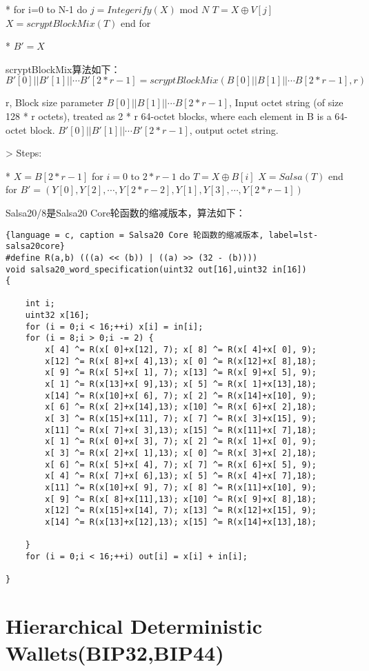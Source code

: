 \documentclass{article}
\begin{document}
 * for i=0 to N-1 do    
 $j=Integerify(X)$ mod $N$  
 $T=X \oplus V[j]$  
 $X=scryptBlockMix(T)$  
 end for
 
 * $B'=X$

scryptBlockMix算法如下：
 $B'[0]||B'[1]||\cdots B'[2*r-1]=scryptBlockMix(B[0]||B[1]||\cdots B[2*r-1],r)$

 r, Block size parameter
 $B[0]||B[1]||\cdots B[2*r-1]$, Input octet string (of size 128 * r octets), treated as 2 * r 64-octet blocks, where each element in B is a 64-octet block.
 $B'[0]||B'[1]||\cdots B'[2*r-1]$, output octet string.

> Steps:

* $X = B[2*r-1]$
 for $i = 0$ to $2*r - 1$ do    
$T=X \oplus B[i]$  
$X=Salsa(T)$  
end for   
$B'=(Y[0],Y[2],\cdots,Y[2*r-2],
Y[1],Y[3],\cdots, Y[2*r-1])$

Salsa20/8是Salsa20 Core轮函数的缩减版本，算法如下：


\begin{lstlisting}{language = c, caption = Salsa20 Core 轮函数的缩减版本, label=lst-salsa20core}
#define R(a,b) (((a) << (b)) | ((a) >> (32 - (b)))) 
void salsa20_word_specification(uint32 out[16],uint32 in[16]) 
{

	int i; 
	uint32 x[16]; 
	for (i = 0;i < 16;++i) x[i] = in[i]; 
	for (i = 8;i > 0;i -= 2) { 
		x[ 4] ^= R(x[ 0]+x[12], 7); x[ 8] ^= R(x[ 4]+x[ 0], 9);
		x[12] ^= R(x[ 8]+x[ 4],13); x[ 0] ^= R(x[12]+x[ 8],18); 
		x[ 9] ^= R(x[ 5]+x[ 1], 7); x[13] ^= R(x[ 9]+x[ 5], 9); 
		x[ 1] ^= R(x[13]+x[ 9],13); x[ 5] ^= R(x[ 1]+x[13],18); 
		x[14] ^= R(x[10]+x[ 6], 7); x[ 2] ^= R(x[14]+x[10], 9); 
		x[ 6] ^= R(x[ 2]+x[14],13); x[10] ^= R(x[ 6]+x[ 2],18); 
		x[ 3] ^= R(x[15]+x[11], 7); x[ 7] ^= R(x[ 3]+x[15], 9); 
		x[11] ^= R(x[ 7]+x[ 3],13); x[15] ^= R(x[11]+x[ 7],18); 
		x[ 1] ^= R(x[ 0]+x[ 3], 7); x[ 2] ^= R(x[ 1]+x[ 0], 9); 
		x[ 3] ^= R(x[ 2]+x[ 1],13); x[ 0] ^= R(x[ 3]+x[ 2],18); 
		x[ 6] ^= R(x[ 5]+x[ 4], 7); x[ 7] ^= R(x[ 6]+x[ 5], 9); 
		x[ 4] ^= R(x[ 7]+x[ 6],13); x[ 5] ^= R(x[ 4]+x[ 7],18); 
		x[11] ^= R(x[10]+x[ 9], 7); x[ 8] ^= R(x[11]+x[10], 9); 
		x[ 9] ^= R(x[ 8]+x[11],13); x[10] ^= R(x[ 9]+x[ 8],18); 
		x[12] ^= R(x[15]+x[14], 7); x[13] ^= R(x[12]+x[15], 9); 
		x[14] ^= R(x[13]+x[12],13); x[15] ^= R(x[14]+x[13],18);

	}
 	for (i = 0;i < 16;++i) out[i] = x[i] + in[i];

}
\end{lstlisting}

\section{Hierarchical Deterministic Wallets(BIP32,BIP44)}
\end{document}
